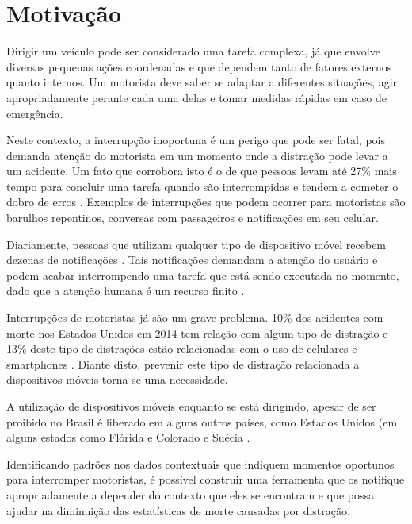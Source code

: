 \chapter{Motivação}
\label{motivacao}
Dirigir um veículo pode ser considerado uma tarefa complexa, já que envolve diversas pequenas ações coordenadas e
que dependem tanto de fatores externos quanto internos. Um motorista deve saber se adaptar a diferentes situações,
agir apropriadamente perante cada uma delas e tomar medidas rápidas em caso de emergência.

Neste contexto, a interrupção inoportuna é um perigo que pode ser fatal, pois demanda atenção do motorista em um momento
onde a distração pode levar a um acidente. Um fato que corrobora isto é o de que pessoas levam até 27\% mais tempo para
concluir uma tarefa quando são interrompidas e tendem a cometer o dobro de erros \cite{bailey2006need}. Exemplos de interrupções que podem
ocorrer para motoristas são barulhos repentinos, conversas com passageiros e notificações em seu celular.

Diariamente, pessoas que utilizam qualquer tipo de dispositivo móvel recebem dezenas de notificações \cite{pielot2014situ}. Tais notificações
demandam a atenção do usuário e podem acabar interrompendo uma tarefa que está sendo executada no momento, dado que a
atenção humana é um recurso finito \cite{simon1971designing}.

Interrupções de motoristas já são um grave problema. 10\% dos acidentes com morte nos Estados Unidos em 2014 tem relação
com algum tipo de distração e 13\% deste tipo de distrações estão relacionadas com o uso de celulares e smartphones \cite{distracted2014}.
Diante disto, prevenir este tipo de distração relacionada a dispositivos móveis torna-se uma necessidade.

A utilização de dispositivos móveis enquanto se está dirigindo, apesar de ser proibido no Brasil é liberado em alguns
outros países, como Estados Unidos (em alguns estados como Flórida e Colorado \cite{cellphoneuse} \cite{distracteddriving} e Suécia \cite{swedendrive}.

Identificando padrões nos dados contextuais que indiquem momentos oportunos para interromper motoristas, é possível
construir uma ferramenta que os notifique apropriadamente a depender do contexto que eles se encontram e que possa ajudar
na diminuição das estatísticas de morte causadas por distração.
